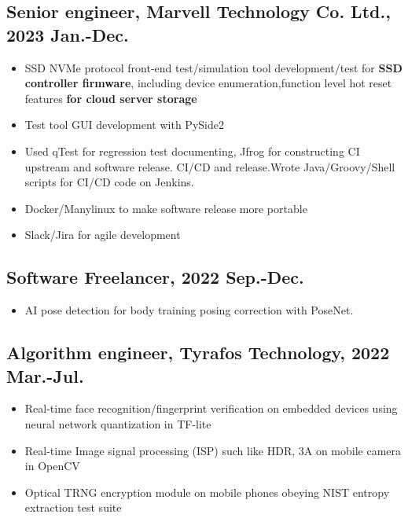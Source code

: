 \documentclass[11pt]{article}
\begin{document}
\begin{multicols*}{2}
\subsection*{Senior engineer, Marvell Technology Co. Ltd., 2023 Jan.-Dec.}
\begin{itemize}[noitemsep]
    \item SSD NVMe protocol front-end test/simulation tool development/test for \textbf{SSD controller firmware}, including device enumeration,function level hot reset features\textbf{ for cloud server storage}
    \item Test tool GUI development with PySide2
    \item Used qTest for regression test documenting, Jfrog for constructing CI upstream and software release. CI/CD and release.Wrote Java/Groovy/Shell scripts for CI/CD code on Jenkins.
    \item Docker/Manylinux to make software release more portable
    \item Slack/Jira for agile development
\end{itemize}

\subsection*{Software Freelancer, 2022 Sep.-Dec.}
\begin{itemize}[noitemsep]
    \item AI pose detection for body training posing correction with PoseNet.
\end{itemize}


\subsection*{\textbf{Algorithm engineer}, Tyrafos Technology, 2022 Mar.-Jul.}
\begin{itemize}[noitemsep]
    \item Real-time face recognition/fingerprint verification on embedded devices using neural network quantization in TF-lite
    \item Real-time Image signal processing (ISP) such like HDR, 3A on mobile camera in OpenCV
    \item Optical TRNG encryption module on mobile phones obeying NIST entropy extraction test suite
\end{itemize}


\end{multicols*}
\end{document}
